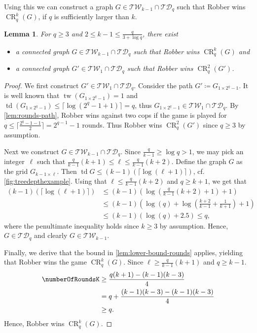\documentclass[10pt,a4paper]{article}
\newtheorem{lemma}[theorem]{Lemma}
\newcommand{\TW}{\ensuremath{\mathcal{TW}}}
\newcommand{\TD}{\ensuremath{\mathcal{TD}}}
\DeclareMathOperator{\CR}{CR}
\DeclareMathOperator{\tw}{tw}
\DeclareMathOperator{\td}{td}
\newcommand{\grid}[2]{\ensuremath{G_{#1 \times #2}}}
\begin{document}
Using this we can construct a graph $G\in\TW_{k-1}\cap\TD_q$ such that Robber wins $\CR_q^k(G)$, if $q$ is sufficiently larger than $k$.

\begin{lemma}
	\label{lem:CR_tw-td}
	For $q\geq 3$ and $2\leq k-1\leq\frac{q}{3 +\log q}$, there exist
	\begin{itemize}
		\item a connected graph $G\in\TW_{k-1}\cap\TD_q$ such that Robber wins $\CR_q^k(G)$ and
		\item a connected graph $G'\in \TW_{1}\cap\TD_q$ such that Robber wins $\CR_q^2(G')$.
	\end{itemize}
\end{lemma}

\begin{proof}
	We first construct $G'\in \TW_{1}\cap\TD_q$.
	Consider the path $G'\coloneqq\grid{1}{2^q-1}$.
	It is well known that $\tw(\grid{1}{2^q-1})=1$ and $\td(\grid{1}{2^q-1})\leq \lceil \log(2^q-1+1)\rceil = q$, thus $\grid{1}{2^q-1}\in \TW_{1}\cap\TD_q$.
	By \cref{lem:rounds-path}, Robber wins against two cops if the game is played for $q \leq \lceil \frac{2^q-1-1}{2}\rceil=2^{q-1} -1$ rounds.
	Thus Robber wins $\CR_q^2(G')$ since $q \geq 3$ by assumption.
	
	Next we construct $G\in\TW_{k-1}\cap\TD_q$.
	Since $\frac{q}{k-1} \geq \log q > 1$, we may pick an integer~$\ell$ such that $\frac{q}{k-1}(k+1) \leq \ell \leq \frac{q}{k-1}(k+2)$.  
	Define the graph $G$ as the grid $\grid{k-1}{\ell}$.
	Then $\td G \leq (k-1)(\lceil \log (\ell+1)\rceil)$, cf.\@ \cref{fig:treedepthexample}.
	Using that $\ell \leq \frac{q}{k-1}(k+2)$ and $q \geq k+1$, we get that 
	\begin{align*}
	(k-1)(\lceil \log (\ell+1)\rceil) &\leq (k-1)\left( \log \left(\frac{q}{k-1}(k+2) + 1 \right)+1\right)\\
	&\leq (k-1)\left( \log (q)+\log\left(\frac{k+2}{k-1} + \frac{1}{k+1} \right)+1\right)\\
	&\leq (k-1)\left( \log (q)+2.5 \right) \leq q,
	\end{align*}
	where the penultimate inequality holds since $k \geq 3$ by assumption.
	Hence, $G \in \TD_q$ and clearly $G \in \TW_{k-1}$.
	
	Finally, we derive that the bound in \cref{lem:lower-bound-rounds} applies, yielding that Robber wins the game $\CR_q^k(G)$.
	Since $\ell \geq \frac{q}{k-1}(k+1)$ and $q \geq k-1$.
	\begin{align*}
		\numberOfRoundsK 
		& \geq \frac{q(k+1) - (k-1)(k-3)}{4} \\ 
		& = q + \frac{(k-1)(k-3) - (k-1)(k-3)}{4} \\
		& \geq q.
	\end{align*}
	Hence, Robber wins $\CR_q^k(G)$.
\end{proof}
\end{document}
